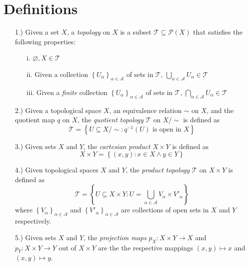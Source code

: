 \documentclass[12pt]{article}
\newcommand{\braces}[1]{\left\{#1\right\}}           %
\begin{document}
\pagestyle{fancy}
\fancyhead{}

\normalsize

\section*{Definitions}
\begin{itemize}
    \item [1.)] Given a set $X$, a \textit{topology} on $X$ is a subset $\mathcal{T}\subseteq\mathcal{P}(X)$ that satisfies the following properties:
    \begin{itemize}
        \item [i.] $\varnothing,X\in\mathcal{T}$

        \item [ii.] Given a collection $\braces{U_\alpha}_{\alpha\in\mathcal{A}}$ of sets in $\mathcal{T}$, $\displaystyle\bigcup_{\alpha\in\mathcal{A}}U_\alpha\in\mathcal{T}$

        \item [iii.] Given a \textit{finite} collection $\braces{U_\alpha}_{\alpha\in\mathcal{A}}$ of sets in $\mathcal{T}$, $\displaystyle\bigcap_{\alpha\in\mathcal{A}}U_\alpha\in\mathcal{T}$
    \end{itemize}

    \item [2.)] Given a topological space $X$, an equivalence relation $\sim$ on $X$, and the quotient map $q$ on $X$, the \textit{quotient topology} $\mathcal{T}$ on $X/{\sim}$ is defined as
    \[\mathcal{T}=\braces{U\subseteq X/{\sim}:q^{-1}(U)\text{ is open in }X}\]

    \item [3.)] Given sets $X$ and $Y$, the \textit{cartesian product} $X\times Y$ is defined as
    \[X\times Y=\braces{(x,y):x\in X\land y\in Y}\]

    \item [4.)] Given topological spaces $X$ and $Y$, the \textit{product topology} $\mathcal{T}$ on $X\times Y$ is defined as
    \[\mathcal{T}=\braces{U\subseteq X\times Y:U=\bigcup_{\alpha\in\mathcal{A}}V_\alpha\times V'_\alpha}\]
    where $\braces{V_{\alpha}}_{\alpha\in\mathcal{A}}$ and $\braces{V'_{\alpha}}_{\alpha\in\mathcal{A}}$ are collections of open sets in $X$ and $Y$ respectively.

    \item [5.)] Given sets $X$ and $Y$, the \textit{projection maps} $p_X:X\times Y\to X$ and $p_Y:X\times Y\to Y$ out of $X\times Y$ are the the respective mappings $(x,y)\mapsto x$ and $(x,y)\mapsto y$.


\end{itemize}
\end{document}
